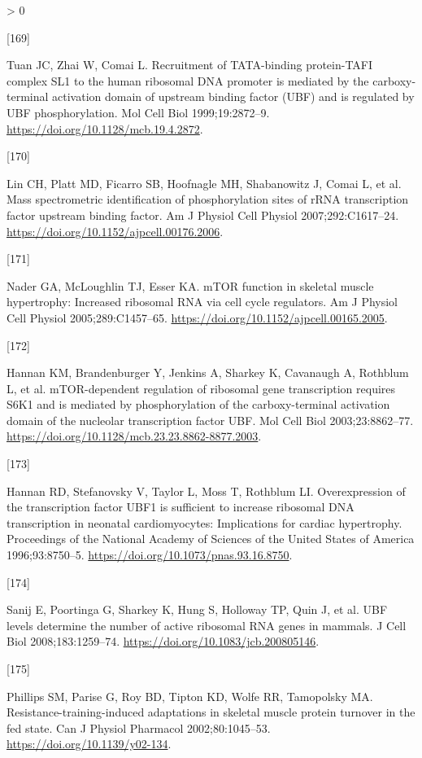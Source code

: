 \documentclass[twoside,10pt]{gihclass} %
\newlength{\cslhangindent}
\newlength{\csllabelwidth}
\newenvironment{CSLReferences}[3] %
 {%
  \setlength{\parindent}{0pt}
  \ifodd #1 \everypar{\setlength{\hangindent}{\cslhangindent}}\ignorespaces\fi
  \ifnum #2 > 0
  \setlength{\parskip}{#2\baselineskip}
  \fi
 }%
 {}
\newcommand{\CSLLeftMargin}[1]{\parbox[t]{\maxof{\widthof{#1}}{\csllabelwidth}}{#1}}
\newcommand{\CSLRightInline}[1]{\parbox[t]{\linewidth}{#1}}
\begin{document}
\begin{CSLReferences}{0}{0}
\leavevmode\hypertarget{ref-RN2582}{}%
\CSLLeftMargin{{[}169{]} }
\CSLRightInline{Tuan JC, Zhai W, Comai L. Recruitment of TATA-binding protein-TAFI complex SL1 to the human ribosomal DNA promoter is mediated by the carboxy-terminal activation domain of upstream binding factor (UBF) and is regulated by UBF phosphorylation. Mol Cell Biol 1999;19:2872--9. \url{https://doi.org/10.1128/mcb.19.4.2872}.}

\leavevmode\hypertarget{ref-RN2563}{}%
\CSLLeftMargin{{[}170{]} }
\CSLRightInline{Lin CH, Platt MD, Ficarro SB, Hoofnagle MH, Shabanowitz J, Comai L, et al. Mass spectrometric identification of phosphorylation sites of rRNA transcription factor upstream binding factor. Am J Physiol Cell Physiol 2007;292:C1617--24. \url{https://doi.org/10.1152/ajpcell.00176.2006}.}

\leavevmode\hypertarget{ref-RN1632}{}%
\CSLLeftMargin{{[}171{]} }
\CSLRightInline{Nader GA, McLoughlin TJ, Esser KA. mTOR function in skeletal muscle hypertrophy: Increased ribosomal RNA via cell cycle regulators. Am J Physiol Cell Physiol 2005;289:C1457--65. \url{https://doi.org/10.1152/ajpcell.00165.2005}.}

\leavevmode\hypertarget{ref-RN2564}{}%
\CSLLeftMargin{{[}172{]} }
\CSLRightInline{Hannan KM, Brandenburger Y, Jenkins A, Sharkey K, Cavanaugh A, Rothblum L, et al. mTOR-dependent regulation of ribosomal gene transcription requires S6K1 and is mediated by phosphorylation of the carboxy-terminal activation domain of the nucleolar transcription factor UBF. Mol Cell Biol 2003;23:8862--77. \url{https://doi.org/10.1128/mcb.23.23.8862-8877.2003}.}

\leavevmode\hypertarget{ref-RN2566}{}%
\CSLLeftMargin{{[}173{]} }
\CSLRightInline{Hannan RD, Stefanovsky V, Taylor L, Moss T, Rothblum LI. Overexpression of the transcription factor UBF1 is sufficient to increase ribosomal DNA transcription in neonatal cardiomyocytes: Implications for cardiac hypertrophy. Proceedings of the National Academy of Sciences of the United States of America 1996;93:8750--5. \url{https://doi.org/10.1073/pnas.93.16.8750}.}

\leavevmode\hypertarget{ref-RN2556}{}%
\CSLLeftMargin{{[}174{]} }
\CSLRightInline{Sanij E, Poortinga G, Sharkey K, Hung S, Holloway TP, Quin J, et al. UBF levels determine the number of active ribosomal RNA genes in mammals. J Cell Biol 2008;183:1259--74. \url{https://doi.org/10.1083/jcb.200805146}.}

\leavevmode\hypertarget{ref-RN2724}{}%
\CSLLeftMargin{{[}175{]} }
\CSLRightInline{Phillips SM, Parise G, Roy BD, Tipton KD, Wolfe RR, Tamopolsky MA. Resistance-training-induced adaptations in skeletal muscle protein turnover in the fed state. Can J Physiol Pharmacol 2002;80:1045--53. \url{https://doi.org/10.1139/y02-134}.}


\end{CSLReferences}
\end{document}
